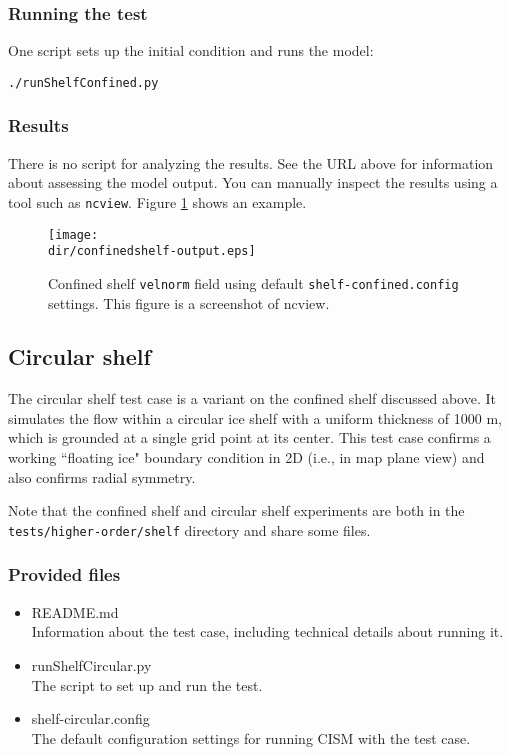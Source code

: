 \subsubsection{Running the test}
One script sets up the initial condition and runs the model:

\texttt{./runShelfConfined.py}

\subsubsection{Results}
There is no script for analyzing the results.  See the URL above for information 
about assessing the model output.
You can manually inspect the results using a tool such as \texttt{ncview}.
Figure \ref{fig:confinedshelf-results} shows an example.

\begin{figure}[H]
	\centering
	\texttt{[image: \\dir/confinedshelf-output.eps]}
	\caption{Confined shelf \texttt{velnorm} field using default \texttt{shelf-confined.config} settings. This figure is a screenshot of ncview.}
	\label{fig:confinedshelf-results}
\end{figure}
\FloatBarrier

\subsection{Circular shelf}
The circular shelf test case is a variant on the confined shelf discussed above. It simulates the flow within a circular ice shelf with a uniform thickness
of 1000 m, which is grounded at a single grid point at its center. This test case confirms a working ``floating ice" boundary condition
in 2D (i.e., in map plane view) and also confirms radial symmetry. 

Note that the confined shelf and circular shelf experiments are both in the 
\texttt{tests/higher-order/shelf} directory and share some files.

\subsubsection{Provided files}

\begin{itemize}
	\item README.md \\
		Information about the test case, including technical details about running it.
	\item runShelfCircular.py \\
		The script to set up and run the test.
	\item shelf-circular.config \\
          The default configuration settings for running CISM with the test case.
\end{itemize}

